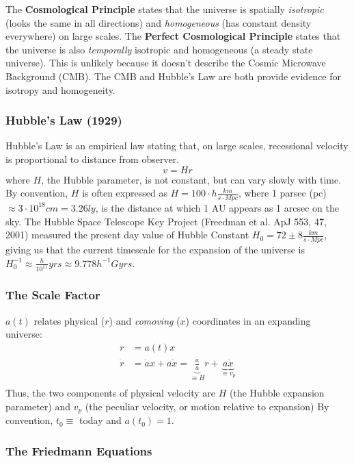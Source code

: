 \documentclass{article}
\def\aa{\frac{\dot a }{ a}}
\begin{document}
The {\bf Cosmological Principle} states that the universe is spatially 
{\it isotropic} (looks the same in all directions) 
and {\it homogeneous} (has constant density everywhere) on large scales.
The {\bf Perfect Cosmological Principle} states that the universe is
also {\it temporally} isotropic and homogeneous (a steady state universe). 
This is unlikely because it doesn't describe the Cosmic Microwave Background
(CMB).  The CMB and Hubble's Law are both provide evidence for isotropy and
homogeneity.

\subsubsection{ Hubble's Law (1929) }

Hubble's Law is an empirical law stating that, on large scales, recessional 
velocity is proportional to distance from observer.
$$\boxed{v=Hr}$$ 
where $H$, the Hubble parameter, is not constant, but can
vary slowly with time.  By convention, $H$ is often expressed as
$H=100\cdot h\frac{km}{ s\cdot Mpc}$, where 1 parsec (pc) $\approx3\cdot10^{18}cm
=3.26ly$, is the distance at which 1 AU appears as 1 arcsec on the sky.  
The Hubble Space Telescope Key Project (Freedman et al. ApJ 553, 47, 2001)
measured the present day value of Hubble Constant 
$H_0=72\pm 8\frac{km}{ s\cdot Mpc}$, giving us that the current timescale for
the expansion of the universe is 
$H_0^{-1}\approx\frac{h}{ 10^{11}}yrs\approx 9.778h^{-1}Gyrs$.

\subsubsection{ The Scale Factor }

$a(t)$ relates physical ($r$) and {\it comoving} ($x$) coordinates in an
expanding universe:
\begin{align}
r&=a(t)x\\
\dot r&=\dot ax+a\dot x=\underbrace{\aa}_{\equiv H}r+\underbrace{a\dot x}_{\equiv v_p}\\
\end{align}
Thus, the two components of physical velocity are $H$ (the Hubble expansion 
parameter) and $v_p$ (the peculiar velocity, or motion relative to expansion)
By convention, $t_0 \equiv$ today and $a(t_0)=1$.

\subsubsection{ The Friedmann Equations}
\end{document}
